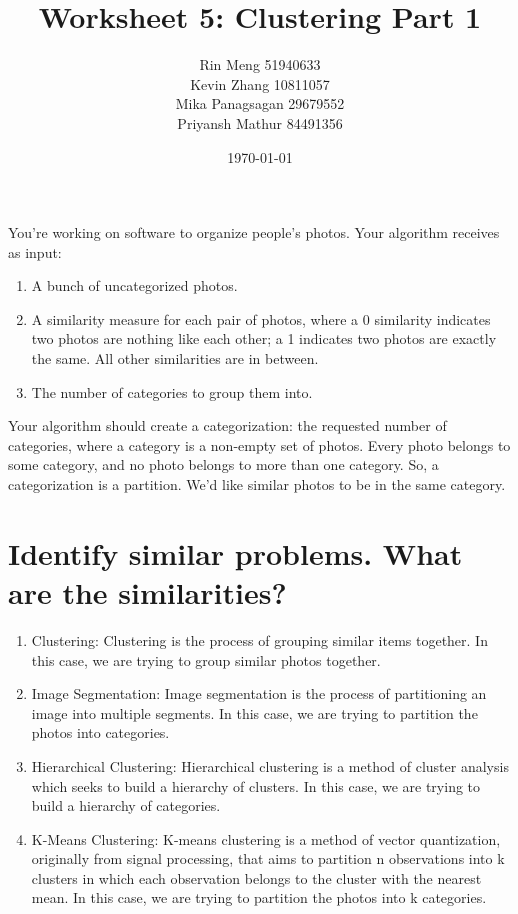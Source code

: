 \documentclass[12pt]{article}
\title{Worksheet 5: Clustering Part 1}
\author{Rin Meng 51940633 \\ Kevin Zhang 10811057 \\ Mika Panagsagan 29679552 \\ Priyansh Mathur 84491356}
\date{\today}
\begin{document}
\maketitle

You’re working on software to organize people’s photos. Your algorithm receives as input:
\begin{enumerate}
    \item A bunch of uncategorized photos.
    \item A similarity measure for each pair of photos, where a 0 similarity indicates two photos are nothing
    like each other; a 1 indicates two photos are exactly the same. All other similarities are in between.
    \item The number of categories to group them into.
\end{enumerate}
Your algorithm should create a categorization: the requested number of categories, where a category is a
non-empty set of photos. Every photo belongs to some category, and no photo belongs to more than one
category. So, a categorization is a partition. We’d like similar photos to be in the same category.

\setcounter{section}{2}



\section{Identify similar problems. What are the similarities?}

\begin{enumerate}
    \item Clustering: Clustering is the process of grouping similar items together. In this case, we are trying to group similar photos together.
    \item Image Segmentation: Image segmentation is the process of partitioning an image into multiple segments. In this case, we are trying to partition the photos into categories.
    \item Hierarchical Clustering: Hierarchical clustering is a method of cluster analysis which seeks to build a hierarchy of clusters. In this case, we are trying to build a hierarchy of categories.
    \item K-Means Clustering: K-means clustering is a method of vector quantization, originally from signal processing, that aims to partition n observations into k clusters in which each observation belongs to the cluster with the nearest mean. In this case, we are trying to partition the photos into k categories.
\end{enumerate}
\end{document}
